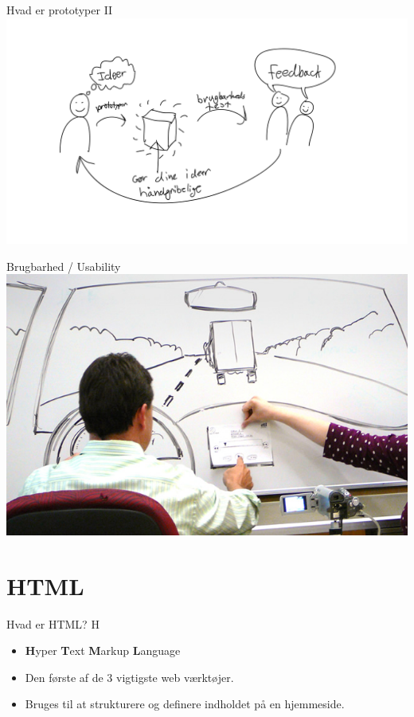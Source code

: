 \documentclass[10pt]{beamer}
\begin{document}
\begin{frame}{Hvad er prototyper II}
	\centering
	\includegraphics[scale=0.18]{img/prototypingloop.pdf}
\end{frame}

\begin{frame}{Brugbarhed / Usability}
		\includegraphics[width=\linewidth]{img/carusability.jpg}
\end{frame}


\section{HTML}


\begin{frame}{Hvad er HTML?}
H\begin{itemize}
	\item \textbf{H}yper \textbf{T}ext \textbf{M}arkup \textbf{L}anguage
	\item Den første af de 3 vigtigste web værktøjer.
	\item Bruges til at strukturere og definere indholdet på en hjemmeside.
\end{itemize}
\end{frame}
\end{document}
